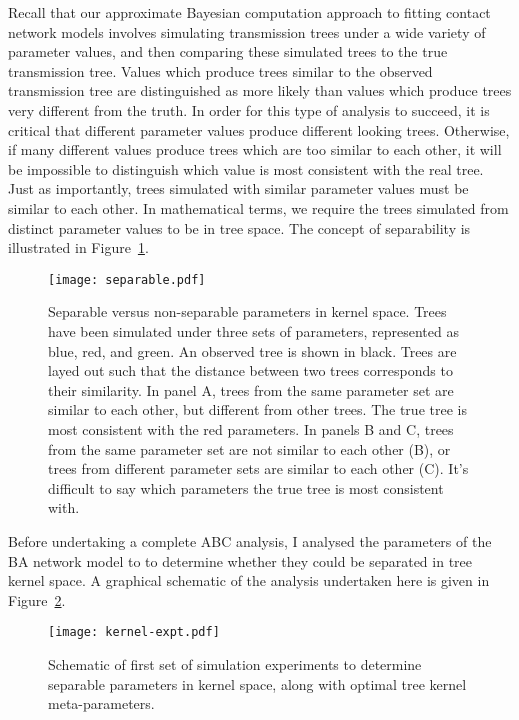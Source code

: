 Recall that our approximate Bayesian computation approach to fitting contact
network models involves simulating transmission trees under a wide variety of
parameter values, and then comparing these simulated trees to the true
transmission tree. Values which produce trees similar to the observed
transmission tree are distinguished as more likely than values which produce
trees very different from the truth. In order for this type of analysis to
succeed, it is critical that different parameter values produce different
looking trees. Otherwise, if many different values produce trees which are too
similar to each other, it will be impossible to distinguish which value is most
consistent with the real tree. Just as importantly, trees simulated with
similar parameter values must be similar to each other. In mathematical terms,
we require the trees simulated from distinct parameter values to be
 in tree space. The concept of separability is illustrated in
Figure~\ref{fig:separable}.

\begin{figure}[ht]
  \centering
  \texttt{[image: separable.pdf]}
  \caption[Separable versus non-separable pararameters in kernel space]{
    Separable versus non-separable parameters in kernel space. Trees have been
    simulated under three sets of parameters, represented as blue, red, and
    green. An observed tree is shown in black. Trees are layed out such that
    the distance between two trees corresponds to their similarity. In panel A,
    trees from the same parameter set are similar to each other, but different
    from other trees. The true tree is most consistent with the red parameters.
    In panels B and C, trees from the same parameter set are not similar to
    each other (B), or trees from different parameter sets are similar to each
    other (C). It's difficult to say which parameters the true tree is most
    consistent with.
  }
  \label{fig:separable}
\end{figure}

Before undertaking a complete ABC analysis, I analysed the parameters of the
\gls{BA} network model to to determine whether they could be separated in tree
kernel space. A graphical schematic of the analysis undertaken here is given in
Figure~\ref{fig:kernelexpt}.

\begin{figure}[ht]
  \centering
  \label{fig:kernelexpt}
  \texttt{[image: kernel-expt.pdf]}
  \caption[Schematic of first set of simulation experiments]{
    Schematic of first set of simulation experiments to determine separable
    parameters in kernel space, along with optimal tree kernel meta-parameters.
  }
\end{figure}

